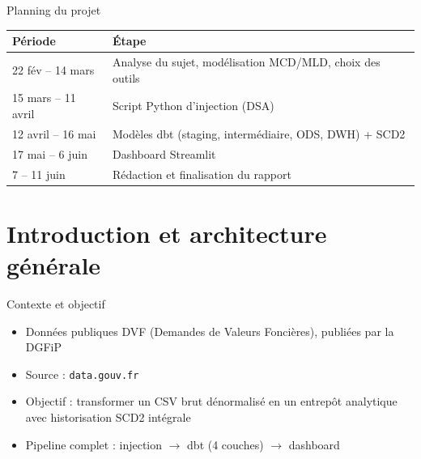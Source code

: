 \documentclass[12pt,aspectratio=169]{beamer}
\newcommand{\dbt}{dbt}
\begin{document}
\begin{frame}{Planning du projet}
  \begin{table}
    \centering
    \footnotesize
    \begin{tabularx}{\linewidth}{lX}
      \toprule
      \textbf{Période} & \textbf{Étape} \\
      \midrule
      22 fév -- 14 mars   & Analyse du sujet, modélisation MCD/MLD, choix des outils \\
      15 mars -- 11 avril & Script Python d'injection (DSA) \\
      12 avril -- 16 mai  & Modèles \dbt{} (staging, intermédiaire, ODS, DWH) + SCD2 \\
      17 mai -- 6 juin    & Dashboard Streamlit \\
      7 -- 11 juin        & Rédaction et finalisation du rapport \\
      \bottomrule
    \end{tabularx}
  \end{table}
\end{frame}

\section{Introduction et architecture générale}

\begin{frame}{Contexte et objectif}
  \begin{itemize}
    \item<+-> Données publiques \alert{DVF} (Demandes de Valeurs Foncières), publiées par la DGFiP
    \item<+-> Source : \texttt{data.gouv.fr}
    \item<+-> Objectif : transformer un \alert{CSV brut dénormalisé} en un
          \alert{entrepôt analytique} avec \alert{historisation SCD2 intégrale}
    \item<+-> Pipeline complet : injection $\to$ \dbt{} (4 couches) $\to$ dashboard
  \end{itemize}
\end{frame}
\end{document}
